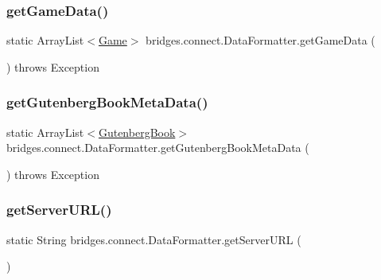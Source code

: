 \subsubsection{\texorpdfstring{get\+Game\+Data()}{getGameData()}}
{\footnotesize\ttfamily static Array\+List$<$\hyperlink{classbridges_1_1data__src__dependent_1_1_game}{Game}$>$ bridges.\+connect.\+Data\+Formatter.\+get\+Game\+Data (\begin{DoxyParamCaption}{ }\end{DoxyParamCaption}) throws Exception\hspace{0.3cm}{\ttfamily [static]}}

\hypertarget{classbridges_1_1connect_1_1_data_formatter_a4bd21bd830238db40b511474afc77b61}{}\label{classbridges_1_1connect_1_1_data_formatter_a4bd21bd830238db40b511474afc77b61} 
\subsubsection{\texorpdfstring{get\+Gutenberg\+Book\+Meta\+Data()}{getGutenbergBookMetaData()}}
{\footnotesize\ttfamily static Array\+List$<$\hyperlink{classbridges_1_1data__src__dependent_1_1_gutenberg_book}{Gutenberg\+Book}$>$ bridges.\+connect.\+Data\+Formatter.\+get\+Gutenberg\+Book\+Meta\+Data (\begin{DoxyParamCaption}{ }\end{DoxyParamCaption}) throws Exception\hspace{0.3cm}{\ttfamily [static]}}

\hypertarget{classbridges_1_1connect_1_1_data_formatter_a4abc8f8b0970d6c07c680ac485e299c7}{}\label{classbridges_1_1connect_1_1_data_formatter_a4abc8f8b0970d6c07c680ac485e299c7} 
\subsubsection{\texorpdfstring{get\+Server\+U\+R\+L()}{getServerURL()}}
{\footnotesize\ttfamily static String bridges.\+connect.\+Data\+Formatter.\+get\+Server\+U\+RL (\begin{DoxyParamCaption}{ }\end{DoxyParamCaption})\hspace{0.3cm}{\ttfamily [static]}}

